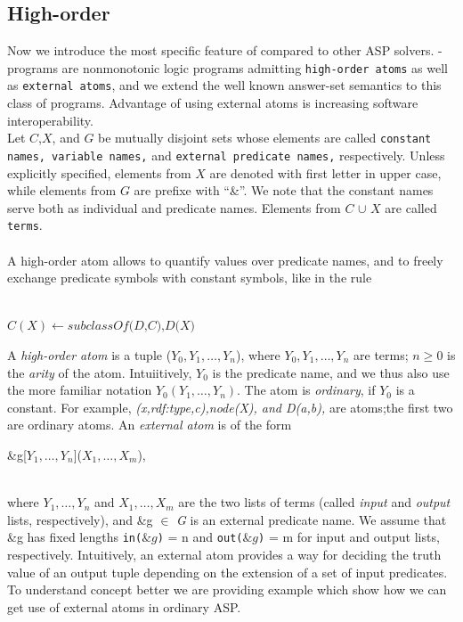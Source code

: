 \documentclass[14pt,a4paper, titlepage]{article}
\begin{document}
\subsection{High-order}
Now we introduce the most specific feature of \dlvhex{} compared to other ASP solvers. \hex{}-programs are nonmonotonic logic programs admitting \texttt{high-order atoms} as well as \texttt{external atoms}, and we extend the well known answer-set semantics to this class of programs. Advantage of using external atoms is increasing software interoperability. \\Let $C$,$X$, and $G$ be mutually disjoint sets whose elements are called \texttt{constant names, variable names,} and \texttt{external predicate names,} respectively. Unless explicitly specified, elements from \texttt{$X$} are denoted with first letter in upper case, while elements from \texttt{$G$} are prefixe with \enquote{\&}. 
We note that the constant names serve both as individual and predicate names. Elements from \texttt{$C$} $\cup$ \texttt{$X$} are called \texttt{terms}. \\ \\A high-order atom allows to quantify values over predicate names, and to freely exchange predicate symbols with constant symbols, like in the rule\\ \centerline{\\$C(X) \leftarrow \textit{subclassOf(D,C),D(X)}$}
A \textit{high-order atom} is a tuple ($Y_0, Y_1,\dots,Y_n$), where $Y_0, Y_1,\dots,Y_n$ are terms; $ n \ge 0$ is the \textit{arity} of the atom. Intuiitively, $Y_0$ is the predicate name, and we thus also use the more familiar notation $Y_0(Y_1,\dots,Y_n)$. The atom is \textit{ordinary}, if $Y_0$ is a constant. For example, \textit{(x,rdf:type,c),node(X), and D(a,b),} are atoms;the first two are ordinary atoms. An \textit{external atom} is of the form \\ \centerline{ \&g[$Y_1,\dots,Y_n$]($X_1,\dots,X_m$),} \\where $Y_1,\dots,Y_n$ and $X_1,\dots,X_m$ are the two lists of terms (called \textit{input} and \textit{output} lists, respectively), and \&g $\in$ \textit{G} is an external predicate name. We assume that \&g has fixed lengths \texttt{in($\&g$)} = n and \texttt{out($\&g$)} = m for input and output lists, respectively. Intuitively, an external atom provides a way for deciding the truth value of an output tuple depending on the extension of a set of input predicates.       
\\To understand concept better we are providing example which show how we can get use of external atoms in ordinary ASP.
\end{document}
